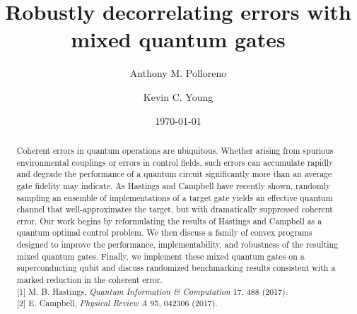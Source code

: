 \documentclass[aps,nofootinbib,pra,notitlepage,twocolumn]{revtex4-1}
\begin{document}
\title{Robustly decorrelating errors with mixed quantum gates}

\author{Anthony M. Polloreno}

\author{Kevin C. Young}

\date{\today}

\begin{abstract}
\noindent Coherent errors in quantum operations are ubiquitous. Whether arising from spurious environmental couplings or errors in control fields, such errors can accumulate rapidly and degrade the performance of a quantum circuit significantly more than an average gate fidelity may indicate. As Hastings \cite{Hastings2017} and Campbell \cite{Campbell2017} have recently shown, randomly sampling an ensemble of implementations of a target gate yields an effective quantum channel that well-approximates the target, but with dramatically suppressed coherent error. Our work begins by reformulating the results of Hastings and Campbell as a quantum optimal control problem. We then discuss a family of convex programs designed to improve the performance, implementability, and robustness of the resulting mixed quantum gates. Finally, we implement these mixed quantum gates on a superconducting qubit and discuss randomized benchmarking results consistent with a marked reduction in the coherent error.\\
{[1]} M. B. Hastings, \emph{Quantum Information \& Computation} 17, 488 (2017). \\
{[2]} E. Campbell, \emph{Physical Review A} 95, 042306 (2017).
\end{abstract}

\pacs{}

\maketitle


\end{document}
